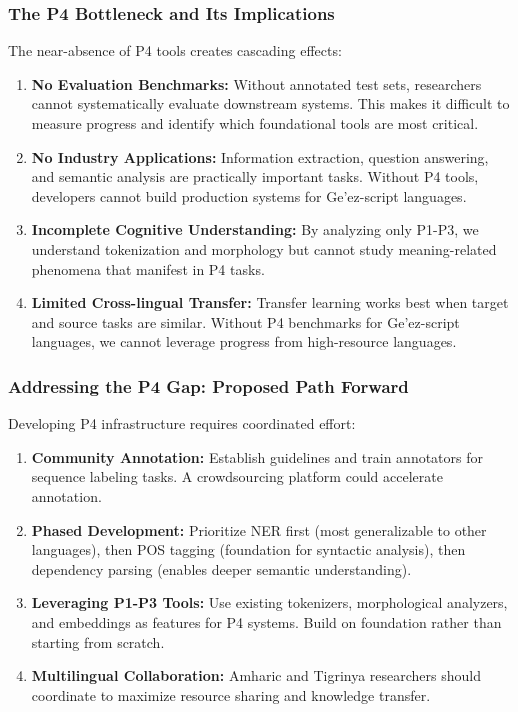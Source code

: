 \documentclass[12pt,a4paper]{article}
\theoremstyle{plain}
\theoremstyle{definition}
\begin{document}
\subsubsection{The P4 Bottleneck and Its Implications}

The near-absence of P4 tools creates cascading effects:

\begin{enumerate}
\item \textbf{No Evaluation Benchmarks:} Without annotated test sets, researchers cannot systematically evaluate downstream systems. This makes it difficult to measure progress and identify which foundational tools are most critical.

\item \textbf{No Industry Applications:} Information extraction, question answering, and semantic analysis are practically important tasks. Without P4 tools, developers cannot build production systems for Ge'ez-script languages.

\item \textbf{Incomplete Cognitive Understanding:} By analyzing only P1-P3, we understand tokenization and morphology but cannot study meaning-related phenomena that manifest in P4 tasks.

\item \textbf{Limited Cross-lingual Transfer:} Transfer learning works best when target and source tasks are similar. Without P4 benchmarks for Ge'ez-script languages, we cannot leverage progress from high-resource languages.
\end{enumerate}

\subsubsection{Addressing the P4 Gap: Proposed Path Forward}

Developing P4 infrastructure requires coordinated effort:

\begin{enumerate}
\item \textbf{Community Annotation:} Establish guidelines and train annotators for sequence labeling tasks. A crowdsourcing platform could accelerate annotation.

\item \textbf{Phased Development:} Prioritize NER first (most generalizable to other languages), then POS tagging (foundation for syntactic analysis), then dependency parsing (enables deeper semantic understanding).

\item \textbf{Leveraging P1-P3 Tools:} Use existing tokenizers, morphological analyzers, and embeddings as features for P4 systems. Build on foundation rather than starting from scratch.

\item \textbf{Multilingual Collaboration:} Amharic and Tigrinya researchers should coordinate to maximize resource sharing and knowledge transfer.
\end{enumerate}
\end{document}
